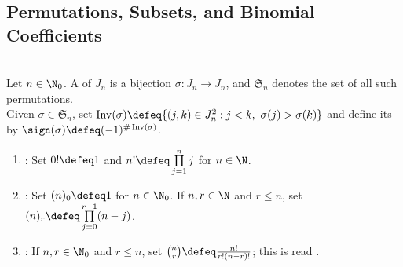 \subsection{Permutations, Subsets, and Binomial Coefficients}


\begin{definition} \label{def:permutations-and-sign} \\
Let $n\in\N_0$. A  of $J_n$ is a bijection $\sigma:J_n\to J_n$, and $\mathfrak{S}_n$ denotes the set of all such permutations.\\
Given $\sigma\in\mathfrak{S}_n$, set $\operatorname{Inv}(\sigma)\defeq\{(j,k)\in J_n^2:j<k,\ \sigma(j)>\sigma(k)\}$ and define its  by $\sign(\sigma)\defeq(-1)^{\#\operatorname{Inv}(\sigma)}$.
\end{definition}

\begin{definition} \label{def:factorials-binomial-coefficients} 
\begin{enumerate}[label=(\roman*)]
\setlength{\itemsep}{0pt}
\item {}: Set $0!\defeq1$ and $n!\defeq\prod\limits_{j=1}^{n}j$ for $n\in\N$.
\item {}: Set $(n)_0\defeq1$ for $n\in\N_0$. If $n,r\in\N$ and $r\leq n$, set $(n)_r\defeq\prod\limits_{j=0}^{r-1}(n-j)$.
\item {}: If $n,r\in\N_0$ and $r\leq n$, set $\binom{n}{r}\defeq\frac{n!}{r!(n-r)!}$; this is read .
\end{enumerate}
\end{definition}

